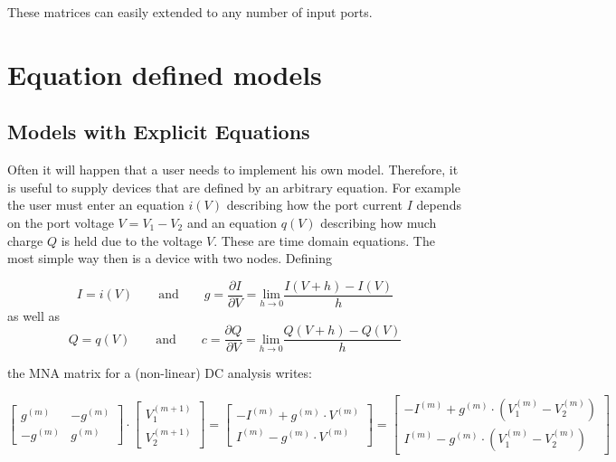 These matrices can easily extended to any number of input ports.


\section{Equation defined models}
\label{sec:eqn_def_models}

\subsection{Models with Explicit Equations}

Often it will happen that a user needs to implement his own model.
Therefore, it is useful to supply devices that are defined by an
arbitrary equation. For example the user must enter an equation $i(V)$
describing how the port current $I$ depends on the port voltage $V=V_1-V_2$
and an equation $q(V)$ describing how much charge $Q$ is held due to
the voltage $V$. These are time domain equations.  The most simple way
then is a device with two nodes.  Defining

\begin{equation}
I = i(V) \qquad\text{and}\qquad
    g = \dfrac{\partial I}{\partial V}
      = \underset{h\rightarrow 0}{\text{lim}}\dfrac{I(V+h) - I(V)}{h}
\end{equation}
as well as
\begin{equation}
Q = q(V) \qquad\text{and}\qquad
    c = \dfrac{\partial Q}{\partial V}
      = \underset{h\rightarrow 0}{\text{lim}}\dfrac{Q(V+h) - Q(V)}{h}
\end{equation}

the MNA matrix for a (non-linear) DC analysis writes:

\begin{equation}
\begin{bmatrix}
 g^{(m)} & -g^{(m)}\\
-g^{(m)} &  g^{(m)}
\end{bmatrix}
\cdot
\begin{bmatrix}
V_{1}^{(m+1)}\\
V_{2}^{(m+1)}
\end{bmatrix}
=
\begin{bmatrix}
-I^{(m)} + g^{(m)}\cdot V^{(m)}\\
 I^{(m)} - g^{(m)}\cdot V^{(m)}
\end{bmatrix}
=
\begin{bmatrix}
-I^{(m)} + g^{(m)}\cdot (V_1^{(m)} - V_2^{(m)})\\
 I^{(m)} - g^{(m)}\cdot (V_1^{(m)} - V_2^{(m)})
\end{bmatrix}
\end{equation}

